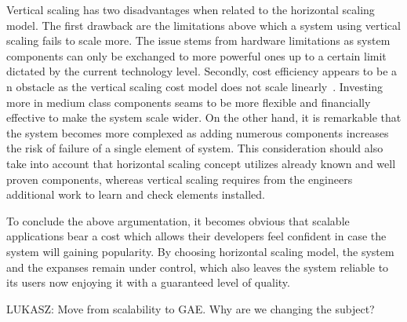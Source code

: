 Vertical scaling has two disadvantages when related to the horizontal scaling model. The first drawback are the limitations above which a system using vertical scaling fails to scale more. The issue stems from hardware limitations as system components can only be exchanged to more powerful ones up to a certain limit dictated by the current technology level. Secondly, cost efficiency appears to be a n obstacle as the vertical scaling cost model does not scale linearly~\cite[page 204]{build_scalable}. Investing more in medium class components seams to be more flexible and financially effective to make the system scale wider. On the other hand, it is remarkable that the system becomes more complexed as adding numerous components increases the risk of failure of a single element of system. This consideration should also take into account that horizontal scaling concept utilizes already known and well proven components, whereas vertical scaling requires from the engineers additional work to learn and check elements installed.

To conclude the above argumentation, it becomes obvious that scalable applications bear a cost which allows their developers feel confident in case the system will gaining popularity. By choosing horizontal scaling model, the system and the expanses remain under control, which also leaves the system reliable to its users now enjoying it with a guaranteed level of quality. 

LUKASZ: Move from scalability to GAE. Why are we changing the subject?        
 
